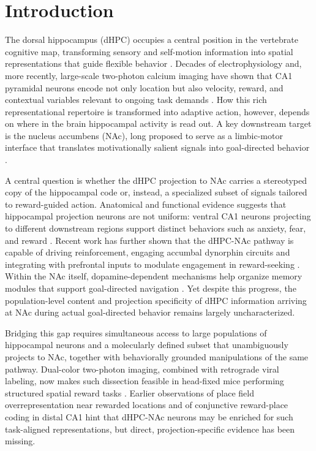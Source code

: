 \section{Introduction}

The dorsal hippocampus (dHPC) occupies a central position in the vertebrate cognitive map, transforming sensory and self-motion information into spatial representations that guide flexible behavior \citep{OKeefe1971PlaceCells,Skaggs1993Information}. Decades of electrophysiology and, more recently, large-scale two-photon calcium imaging have shown that CA1 pyramidal neurons encode not only location but also velocity, reward, and contextual variables relevant to ongoing task demands \citep{Gauthier2018Reward,Sosa2018Reward,Sato2020Overrepresentation}. How this rich representational repertoire is transformed into adaptive action, however, depends on where in the brain hippocampal activity is read out. A key downstream target is the nucleus accumbens (NAc), long proposed to serve as a limbic-motor interface that translates motivationally salient signals into goal-directed behavior \citep{Mogenson1980Motivation,Britt2012Synaptic}.

A central question is whether the dHPC projection to NAc carries a stereotyped copy of the hippocampal code or, instead, a specialized subset of signals tailored to reward-guided action. Anatomical and functional evidence suggests that hippocampal projection neurons are not uniform: ventral CA1 neurons projecting to different downstream regions support distinct behaviors such as anxiety, fear, and reward \citep{Ciocchi2015Selective,Bakoyiannis2023Pathway}. Recent work has further shown that the dHPC-NAc pathway is capable of driving reinforcement, engaging accumbal dynorphin circuits and integrating with prefrontal inputs to modulate engagement in reward-seeking \citep{Ibrahim2024DorsalHPC,Iyer2025Engagement}. Within the NAc itself, dopamine-dependent mechanisms help organize memory modules that support goal-directed navigation \citep{Jung2024Dopamine}. Yet despite this progress, the population-level content and projection specificity of dHPC information arriving at NAc during actual goal-directed behavior remains largely uncharacterized.

Bridging this gap requires simultaneous access to large populations of hippocampal neurons and a molecularly defined subset that unambiguously projects to NAc, together with behaviorally grounded manipulations of the same pathway. Dual-color two-photon imaging, combined with retrograde viral labeling, now makes such dissection feasible in head-fixed mice performing structured spatial reward tasks \citep{Tervo2016AAVretro,Chen2013GCaMP6,Dana2014Thy1GCaMP6}. Earlier observations of place field overrepresentation near rewarded locations and of conjunctive reward-place coding in distal CA1 \citep{Hok2007Goal,Mamad2017PlaceField,Xiao2020Conjunctive,Kaufman2020LocusCoeruleus} hint that dHPC-NAc neurons may be enriched for such task-aligned representations, but direct, projection-specific evidence has been missing.

